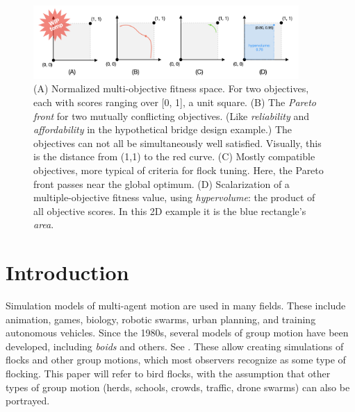 \documentclass[letterpaper]{article}
\begin{document}


\begin{figure}[t]
    \centering
    \includegraphics[width=0.9\textwidth]{images/temp_MOF_HV.png}
    \caption{(A) Normalized multi-objective fitness space. For two objectives, each with scores ranging over [0, 1], a unit square. (B) The \textit{Pareto front} for two mutually conflicting objectives. (Like \textit{reliability} and \textit{affordability} in the hypothetical bridge design example.) The objectives can not all be simultaneously well satisfied. Visually, this is the distance from (1,1) to the red curve. (C) Mostly compatible objectives, more typical of criteria for flock tuning. Here, the Pareto front passes near the global optimum. (D) Scalarization of a multiple-objective fitness value, using \textit{hypervolume}: the product of all objective scores. In this 2D example it is the blue rectangle's \textit{area}.}
    \label{fig:MOF_HV}
\end{figure}


\section{Introduction}
\label{sec:intro}

Simulation models of multi-agent motion are used in many fields. These include animation, games, biology, robotic swarms, urban planning, and training autonomous vehicles. Since the 1980s, several models of group motion have been developed, including \textit{boids} and others. See . These allow creating simulations of flocks and other group motions, which most observers recognize as some type of flocking. This paper will refer to bird flocks, with the assumption that other types of group motion (herds, schools, crowds, traffic, drone swarms) can also be portrayed.
\end{document}
